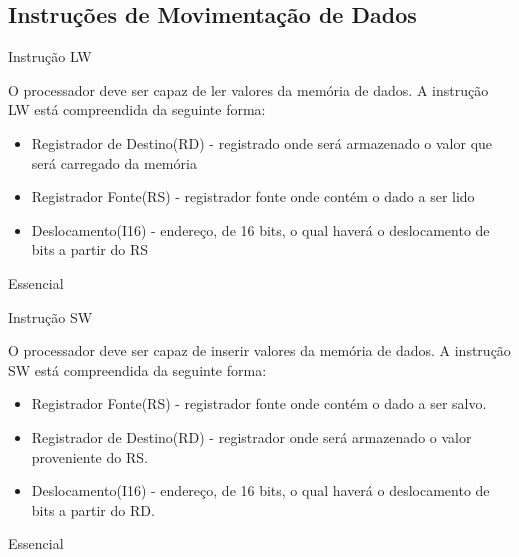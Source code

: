 \documentclass{article}
\begin{document}
  \subsection{Instruções de Movimentação de Dados}
    \begin{functional}
     \requirement
      {Instrução LW}
      {O processador deve ser capaz de ler valores da memória de dados.
       A instrução LW está compreendida da seguinte forma:
       \begin{itemize}
        \item Registrador de Destino(RD) - registrado onde será armazenado o valor que será carregado da memória
        \item Registrador Fonte(RS) - registrador fonte onde contém o dado a ser lido
        \item Deslocamento(I16) - endereço, de 16 bits, o qual haverá o deslocamento de bits a partir do RS
       \end{itemize}
      }
      {Essencial}
    
     \requirement
      {Instrução SW}
      {O processador deve ser capaz de inserir valores da memória de dados.
      A instrução SW está compreendida da seguinte forma:
       \begin{itemize}
        \item Registrador Fonte(RS) - registrador fonte onde contém o dado a ser salvo.
        \item Registrador de Destino(RD) - registrador onde será armazenado o valor proveniente do RS.
        \item Deslocamento(I16) - endereço, de 16 bits, o qual haverá o deslocamento de bits a partir do RD.
       \end{itemize}}
      {Essencial}
    \end{functional}
    
\end{document}
